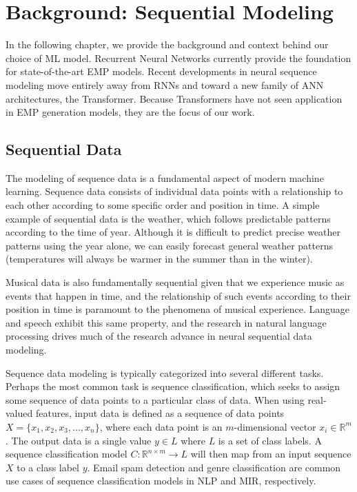 \chapter{Background: Sequential Modeling}\label{ch:ch3}


In the following chapter, we provide the background and context behind our choice of ML model. Recurrent Neural Networks currently provide the foundation for state-of-the-art EMP models. Recent developments in neural sequence modeling move entirely away from RNNs and toward a new family of ANN architectures, the Transformer. Because Transformers have not seen application in EMP generation models, they are the focus of our work. 

\section{Sequential Data}\label{sec:sequential-data}
The modeling of sequence data is a fundamental aspect of modern machine learning. Sequence data consists of individual data points with a relationship to each other according to some specific order and position in time. A simple example of sequential data is the weather, which follows predictable patterns according to the time of year. Although it is difficult to predict precise weather patterns using the year alone, we can easily forecast general weather patterns (temperatures will always be warmer in the summer than in the winter). 

Musical data is also fundamentally sequential\cite{widmer2016getting} given that we experience music as events that happen in time, and the relationship of such events according to their position in time is paramount to the phenomena of musical experience. Language and speech exhibit this same property, and the research in natural language processing drives much of the research advance in neural sequential data modeling. 

Sequence data modeling is typically categorized into several different tasks. Perhaps the most common task is sequence classification, which seeks to assign some sequence of data points to a particular class of data. When using real-valued features, input data is defined as a sequence of data points $X = \{x_1, x_2, x_3, ..., x_n\}$, where each data point is an $m$-dimensional vector $x_i \in \mathbb{R}^m$. The output data is a single value $y \in L$ where $L$ is a set of class labels. A sequence classification model $C: \mathbb{R}^{n \times m} \rightarrow L$ will then map from an input sequence $X$ to a class label $y$. Email spam detection and genre classification are common use cases of sequence classification models in NLP and MIR, respectively. 

